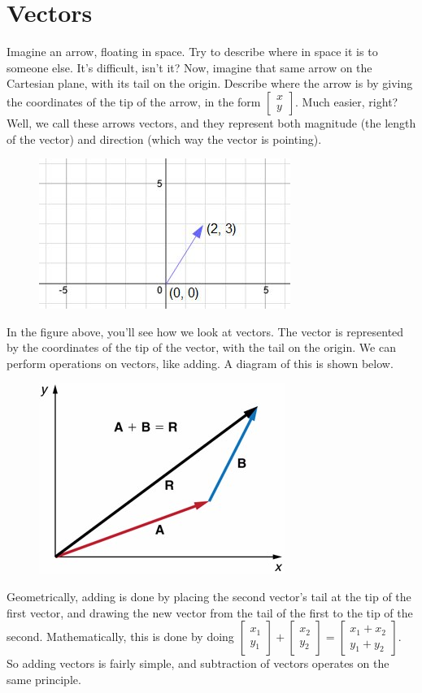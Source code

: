 \section{Vectors}
Imagine an arrow, floating in space. Try to describe where in space it is to someone else. It's difficult, isn't it?
Now, imagine that same arrow on the Cartesian plane, with its tail on the origin. Describe where the arrow is by giving the coordinates of the tip of the arrow, in the form $\begin{bmatrix}x\\y\end{bmatrix}$.
Much easier, right? Well, we call these arrows vectors, and they represent both magnitude (the length of the vector) and direction (which way the vector is pointing). 
\begin{center}
\begin{figure}[H]
\includegraphics[scale=0.7]{visualvectordotproduct1.jpg}
\end{figure}
\end{center}
In the figure above, you'll see how we look at vectors. The vector is represented by the coordinates of the tip of the vector, with the tail on the origin. We can perform operations on vectors, like adding. A diagram of this is shown below.
\begin{figure}[H]
\includegraphics[scale=0.5]{Figure_03_03_05a.jpg}
\end{figure}
Geometrically, adding is done by placing the second vector's tail at the tip of the first vector, and drawing the new vector from the tail of the first to the tip of the second. Mathematically, this is done by doing $\begin{bmatrix}x_1\\y_1\end{bmatrix}+\begin{bmatrix}x_2\\y_2\end{bmatrix}=\begin{bmatrix}x_1+x_2\\y_1+y_2\end{bmatrix}$. So adding vectors is fairly simple, and subtraction of vectors operates on the same principle.
